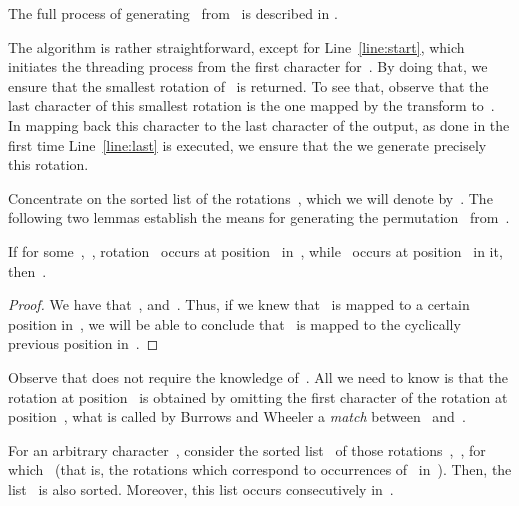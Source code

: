\documentclass[a4paper,12pt]{article}
\newcommand{\Abs}[1]{\ensuremath{\left|#1\right|}}
\numberwithin{algorithm}{section}
\begin{document}
The full process of generating~ from~ is described in .

\begin{algorithm}[!htb]
\caption{
  \newline
\mbox{}\hfill
  }
\label{Algorithm:Thread}
\begin{algorithmic}[1]
\LET{n}{\Abs{η}}
\STATE{}
\label{line:start}
    \STATE{}
\label{line:last}
    \STATE{}
\ENDFOR
\RETURN
\end{algorithmic}
\end{algorithm}

The algorithm is rather straightforward,
  except for Line~\ref{line:start}, which initiates the threading process
  from the first character for~.
By doing that, we ensure that the smallest rotation of~ is returned.
To see that, observe that the last character of this smallest rotation is the one mapped by the transform to~.
In mapping back this character to the last character of the output, as done in the first time Line~\ref{line:last}
  is executed, we ensure that the we generate precisely this rotation.

Concentrate on the sorted list of the rotations~,
  which we will denote by~.
The following two lemmas establish the means for generating the permutation~ from~.
\begin{Lemma}[next]
If for some~,~, rotation~ occurs at position~ in~,
  while~ occurs at position~ in it, then~.
\end{Lemma}

\begin{proof}
We have that~, and~.
Thus, if we knew that~ is mapped to a certain position in~, we will be able to conclude
  that~ is mapped
  to the cyclically previous position in~.
\end{proof}

Observe that  does not require the knowledge of~.
All we need to know is that the rotation at position~ is obtained by omitting the first
  character of the rotation at position~, what is called by Burrows and Wheeler
  a \emph{match} between~ and~.

\begin{Lemma}[match]
For an arbitrary character~, consider
  the sorted list~ of those
  rotations~,~,
  for which~ (that is, the rotations which correspond to occurrences of~ in~).
Then, the list~  is also sorted.
  Moreover, this list occurs consecutively in~.
\end{Lemma}
\end{document}
